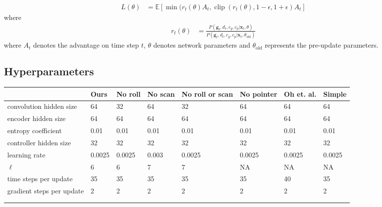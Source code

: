 \documentclass{article}
\DeclareMathOperator{\clip}{clip}
\begin{document}
\begin{align}
	L(\theta) &= \mathbb{E}[\min(r_t(\theta)A_t, \clip\left(r_t(\theta), 1 - \epsilon, 1 +
	\epsilon\right)A_t]
\end{align}
where
\begin{align}
	r_t(\theta) &= \frac{P(\mathbf{g}_t, d_t, c_g, c_p|\mathbf{x}_t, \theta)}{P(\mathbf{g}_t, d_t, c_g, c_p|\mathbf{x}_t, \theta_{\text{old}})}
\end{align}
where $A_t$ denotes the advantage on time step $t$, $\theta$ denotes network parameters and $\theta_\text{old}$ represents the pre-update parameters.
\begin{landscape}
\subsection{Hyperparameters}

\begin{tabular}{l|lllllll}
                          & Ours   & No roll & No scan & No roll or scan & No pointer & Oh et. al. & Simple \\
                          \hline

convolution hidden size   & 64     & 32      & 64      & 32              & 64         & 64         & 64     \\
encoder hidden size       & 64     & 64      & 64      & 64              & 64         & 64         & 64     \\
entropy coefficient       & 0.01   & 0.01    & 0.01    & 0.01            & 0.01       & 0.01       & 0.01   \\
controller hidden size    & 32     & 32      & 32      & 32              & 32         & 32         & 32     \\
learning rate             & 0.0025 & 0.0025  & 0.003   & 0.0025          & 0.0025     & 0.0025     & 0.0025 \\
$\ell$                    & 6      & 6       & 7       & 7               & NA         & NA         & NA     \\
time steps per update     & 35     & 35      & 35      & 35              & 35         & 40         & 35     \\
gradient steps per update & 2      & 2       & 2       & 2               & 2          & 2          & 2      \\
                          &        &         &         &                 &            &            &        \\
                          &        &         &         &                 &            &            &       
\end{tabular}
\end{landscape}
\end{document}
